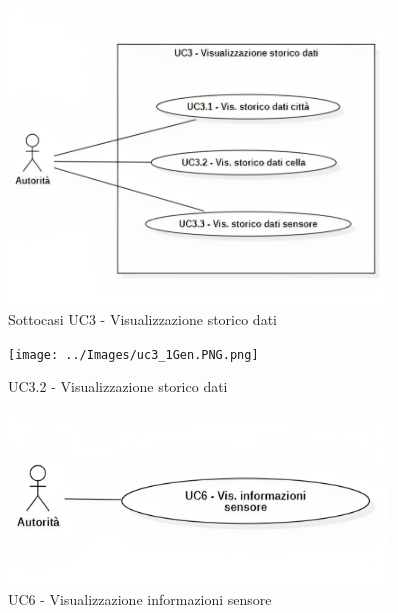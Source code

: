 \begin{figure}[H]
    \centering
    \includegraphics[width=0.9\textwidth]{../Images/uc3_Subcase.png}
    \caption{Sottocasi UC3 - Visualizzazione storico dati }
    \label{fig:UC3_sub}
\end{figure}





\begin{figure}[H]
    \centering
    \texttt{[image: ../Images/uc3\_1Gen.PNG.png]}
    \caption{UC3.2 - Visualizzazione storico dati }
    \label{fig:UC3_gen}
\end{figure}






\begin{figure}[H]
    \centering
    \includegraphics[width=0.9\textwidth]{../Images/uc6.png}
    \caption{UC6 - Visualizzazione informazioni sensore}
    \label{fig:UC6}
\end{figure}


